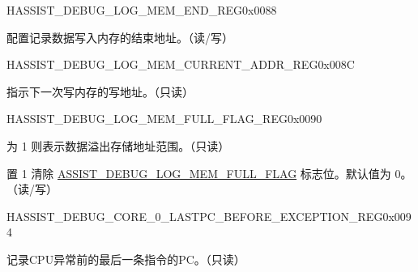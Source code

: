 \begin{register}{H}{ASSIST\_DEBUG\_LOG\_MEM\_END\_REG}{0x0088}\label{regdesc:ASSISTDEBUGLOGMEMENDREG}
%
\regnewline%
\begin{regdesc}\begin{reglist}
\label{fielddesc:ASSISTDEBUGLOGMEMEND}\item [ASSIST\_DEBUG\_LOG\_MEM\_END] 配置记录数据写入内存的结束地址。（读/写）
\end{reglist}\end{regdesc}
\end{register}


\begin{register}{H}{ASSIST\_DEBUG\_LOG\_MEM\_CURRENT\_ADDR\_REG}{0x008C}\label{regdesc:ASSISTDEBUGLOGMEMCURRENTADDRREG}
%
\regnewline%
\begin{regdesc}\begin{reglist}
\label{fielddesc:ASSISTDEBUGLOGMEMWRITINGADDR}\item [ASSIST\_DEBUG\_LOG\_MEM\_WRITING\_ADDR] 指示下一次写内存的写地址。（只读）
\end{reglist}\end{regdesc}
\end{register}


\begin{register}{H}{ASSIST\_DEBUG\_LOG\_MEM\_FULL\_FLAG\_REG}{0x0090}\label{regdesc:ASSISTDEBUGLOGMEMFULLFLAGREG}
%
%
%
\regnewline%
\begin{regdesc}\begin{reglist}
\label{fielddesc:ASSISTDEBUGLOGMEMFULLFLAG}\item [ASSIST\_DEBUG\_LOG\_MEM\_FULL\_FLAG] 为 1 则表示数据溢出存储地址范围。（只读）
\label{fielddesc:ASSISTDEBUGCLRLOGMEMFULLFLAG}\item [ASSIST\_DEBUG\_CLR\_LOG\_MEM\_FULL\_FLAG] 置 1 清除 \hyperref[fielddesc:ASSISTDEBUGLOGMEMFULLFLAG]{ASSIST\_DEBUG\_LOG\_MEM\_FULL\_FLAG} 标志位。默认值为 0。（读/写）
\end{reglist}\end{regdesc}
\end{register}


\begin{register}{H}{ASSIST\_DEBUG\_CORE\_0\_LASTPC\_BEFORE\_EXCEPTION\_REG}{0x0094}\label{regdesc:ASSISTDEBUGCORE0LASTPCBEFOREEXCEPTIONREG}
%
\regnewline%
\begin{regdesc}\begin{reglist}
\label{fielddesc:ASSISTDEBUGCORE0LASTPCBEFOREEXC}\item [ASSIST\_DEBUG\_CORE\_0\_LASTPC\_BEFORE\_EXC] 记录CPU异常前的最后一条指令的PC。（只读）
\end{reglist}\end{regdesc}
\end{register}


